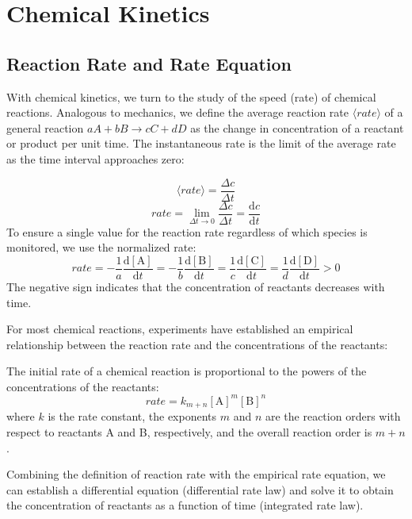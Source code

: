\section{Chemical Kinetics}
\subsection{Reaction Rate and Rate Equation}
With chemical kinetics, we turn to the study of the speed (rate) of chemical reactions. Analogous to mechanics, we define the average reaction rate $\langle rate \rangle$ of a general reaction $aA + bB \rightarrow cC + dD$ as the change in concentration of a reactant or product per unit time. The instantaneous rate is the limit of the average rate as the time interval approaches zero:

\begin{definition}
$$\langle rate \rangle = \frac{\Delta c}{\Delta t}$$
$$rate = \lim_{\Delta t \to 0} \frac{\Delta c}{\Delta t} = \frac{\mathrm{d}c}{\mathrm{d}t}$$
To ensure a single value for the reaction rate regardless of which species is monitored, we use the normalized rate:
$$rate = -\frac{1}{a}\frac{\mathrm{d}[\text{A}]}{\mathrm{d}t} = -\frac{1}{b}\frac{\mathrm{d}[\text{B}]}{\mathrm{d}t} = \frac{1}{c}\frac{\mathrm{d}[\text{C}]}{\mathrm{d}t} = \frac{1}{d}\frac{\mathrm{d}[\text{D}]}{\mathrm{d}t} > 0$$
The negative sign indicates that the concentration of reactants decreases with time.
\end{definition}

For most chemical reactions, experiments have established an empirical relationship between the reaction rate and the concentrations of the reactants:

\begin{definition}
The initial rate of a chemical reaction is proportional to the powers of the concentrations of the reactants:
$$rate = k_{m+n}[\text{A}]^m[\text{B}]^n$$
where $k$ is the rate constant, the exponents $m$ and $n$ are the reaction orders with respect to reactants A and B, respectively, and the overall reaction order is $m + n$.
\end{definition}

Combining the definition of reaction rate with the empirical rate equation, we can establish a differential equation (differential rate law) and solve it to obtain the concentration of reactants as a function of time (integrated rate law).

